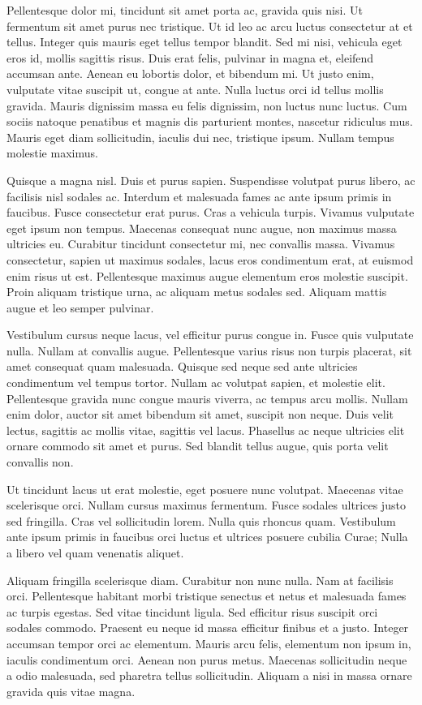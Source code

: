 \documentclass[12pt, twoside]{report}\usepackage[]{graphicx}\usepackage[]{color}
\begin{document}
Pellentesque dolor mi, tincidunt sit amet porta ac, gravida quis nisi. Ut fermentum sit amet purus nec tristique. Ut id leo ac arcu luctus consectetur at et tellus. Integer quis mauris eget tellus tempor blandit. Sed mi nisi, vehicula eget eros id, mollis sagittis risus. Duis erat felis, pulvinar in magna et, eleifend accumsan ante. Aenean eu lobortis dolor, et bibendum mi. Ut justo enim, vulputate vitae suscipit ut, congue at ante. Nulla luctus orci id tellus mollis gravida. Mauris dignissim massa eu felis dignissim, non luctus nunc luctus. Cum sociis natoque penatibus et magnis dis parturient montes, nascetur ridiculus mus. Mauris eget diam sollicitudin, iaculis dui nec, tristique ipsum. Nullam tempus molestie maximus.

Quisque a magna nisl. Duis et purus sapien. Suspendisse volutpat purus libero, ac facilisis nisl sodales ac. Interdum et malesuada fames ac ante ipsum primis in faucibus. Fusce consectetur erat purus. Cras a vehicula turpis. Vivamus vulputate eget ipsum non tempus. Maecenas consequat nunc augue, non maximus massa ultricies eu. Curabitur tincidunt consectetur mi, nec convallis massa. Vivamus consectetur, sapien ut maximus sodales, lacus eros condimentum erat, at euismod enim risus ut est. Pellentesque maximus augue elementum eros molestie suscipit. Proin aliquam tristique urna, ac aliquam metus sodales sed. Aliquam mattis augue et leo semper pulvinar.

Vestibulum cursus neque lacus, vel efficitur purus congue in. Fusce quis vulputate nulla. Nullam at convallis augue. Pellentesque varius risus non turpis placerat, sit amet consequat quam malesuada. Quisque sed neque sed ante ultricies condimentum vel tempus tortor. Nullam ac volutpat sapien, et molestie elit. Pellentesque gravida nunc congue mauris viverra, ac tempus arcu mollis. Nullam enim dolor, auctor sit amet bibendum sit amet, suscipit non neque. Duis velit lectus, sagittis ac mollis vitae, sagittis vel lacus. Phasellus ac neque ultricies elit ornare commodo sit amet et purus. Sed blandit tellus augue, quis porta velit convallis non.

Ut tincidunt lacus ut erat molestie, eget posuere nunc volutpat. Maecenas vitae scelerisque orci. Nullam cursus maximus fermentum. Fusce sodales ultrices justo sed fringilla. Cras vel sollicitudin lorem. Nulla quis rhoncus quam. Vestibulum ante ipsum primis in faucibus orci luctus et ultrices posuere cubilia Curae; Nulla a libero vel quam venenatis aliquet.

Aliquam fringilla scelerisque diam. Curabitur non nunc nulla. Nam at facilisis orci. Pellentesque habitant morbi tristique senectus et netus et malesuada fames ac turpis egestas. Sed vitae tincidunt ligula. Sed efficitur risus suscipit orci sodales commodo. Praesent eu neque id massa efficitur finibus et a justo. Integer accumsan tempor orci ac elementum. Mauris arcu felis, elementum non ipsum in, iaculis condimentum orci. Aenean non purus metus. Maecenas sollicitudin neque a odio malesuada, sed pharetra tellus sollicitudin. Aliquam a nisi in massa ornare gravida quis vitae magna.
\end{document}
